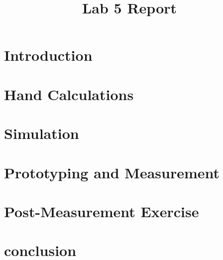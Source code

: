 \documentclass{article}
\title{Lab 5 Report}
\begin{document}
\maketitle
\section{Introduction}

\section{Hand Calculations}

\section{Simulation}

\section{Prototyping and Measurement}

\section{Post-Measurement Exercise}

\section{conclusion}
\end{document}
